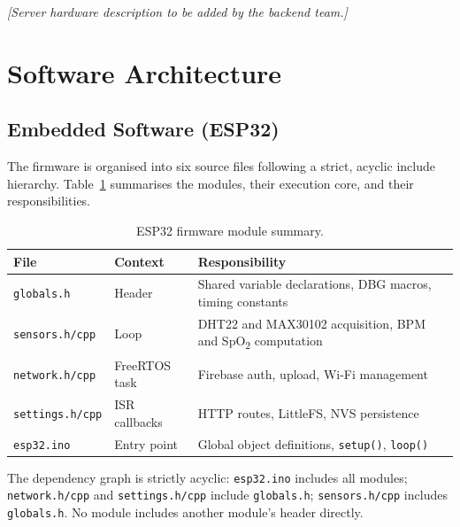 \begin{center}
	\textit{[Server hardware description to be added by the backend team.]}
\end{center}

\section{Software Architecture}

\subsection*{Embedded Software (ESP32)}

The firmware is organised into six source files following a strict, acyclic include
hierarchy.
Table~\ref{tab:sw_modules} summarises the modules, their execution core, and their
responsibilities.

\begin{table}[h!]
	\centering
	\caption{ESP32 firmware module summary.}
	\label{tab:sw_modules}
	\begin{tabularx}{\linewidth}{lllX}
		\toprule
		\textbf{File}           & \textbf{Context} & \textbf{Responsibility}                                                  \\
		\midrule
		\texttt{globals.h}      & Header           & Shared variable declarations, DBG macros, timing constants               \\
		\texttt{sensors.h/cpp}  & Loop             & DHT22 and MAX30102 acquisition, BPM and SpO\textsubscript{2} computation \\
		\texttt{network.h/cpp}  & FreeRTOS task    & Firebase auth, upload, Wi-Fi management                                  \\
		\texttt{settings.h/cpp} & ISR callbacks    & HTTP routes, LittleFS, NVS persistence                                   \\
		\texttt{esp32.ino}      & Entry point      & Global object definitions, \texttt{setup()}, \texttt{loop()}             \\
		\bottomrule
	\end{tabularx}
\end{table}

The dependency graph is strictly acyclic: \texttt{esp32.ino} includes all modules;
\texttt{network.h/cpp} and \texttt{settings.h/cpp} include \texttt{globals.h};
\texttt{sensors.h/cpp} includes \texttt{globals.h}.
No module includes another module's header directly.

